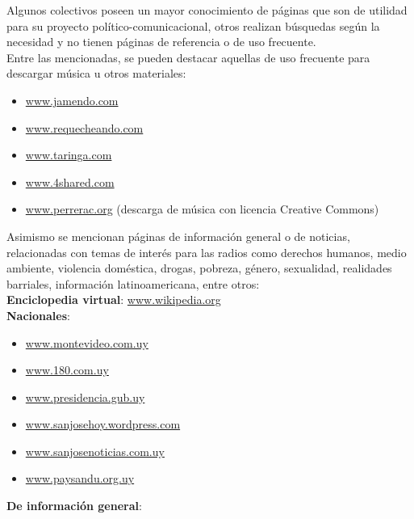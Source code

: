 Algunos colectivos poseen un mayor conocimiento de páginas que son de utilidad para su proyecto político-comunicacional, otros realizan búsquedas según la necesidad y no tienen páginas de referencia o de uso frecuente.\\

Entre las mencionadas, se pueden destacar aquellas de uso frecuente para descargar música u otros materiales:\\

\begin{itemize}
 \item \href{http://www.jamendo.com}{www.jamendo.com}
 \item \href{http://www.requecheando.com}{www.requecheando.com}
 \item \href{http://www.taringa.com}{www.taringa.com}
 \item \href{http://www.4shared.com}{www.4shared.com}
 \item \href{http://www.perrerac.org}{www.perrerac.org} (descarga de música con licencia Creative Commons)
\end{itemize}

\indent Asimismo se mencionan páginas de información general o de noticias, relacionadas con temas de interés para las radios como derechos humanos, medio ambiente, violencia doméstica, drogas, pobreza, género, sexualidad, realidades barriales, información latinoamericana, entre otros:\\

\textbf{Enciclopedia virtual}:
\href{http://www.wikipedia.org}{www.wikipedia.org}\\

\textbf{Nacionales}:
\begin{itemize}
 \item \href{http://www.montevideo.com.uy}{www.montevideo.com.uy}
 \item \href{http://www.180.com.uy}{www.180.com.uy}
 \item \href{http://www.presidencia.gub.uy}{www.presidencia.gub.uy}
 \item \href{http://www.sanjosehoy.wordpress.com}{www.sanjosehoy.wordpress.com}
 \item \href{http://www.sanjosenoticias.com.uy}{www.sanjosenoticias.com.uy}
 \item \href{http://www.paysandu.org.uy}{www.paysandu.org.uy}
\end{itemize}

\textbf{De información general}:


